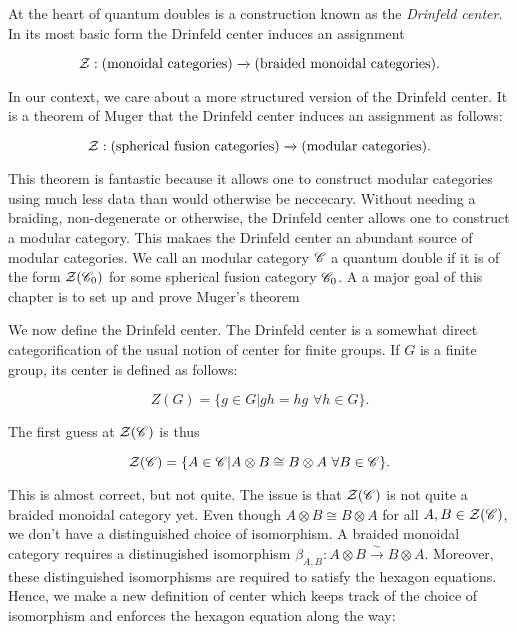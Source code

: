 At the heart of quantum doubles is a construction known as the \textit{Drinfeld center}. In its most basic form the Drinfeld center induces an assignment

$$\mathcal{Z}: (\text{monoidal categories})\xrightarrow{}(\text{braided monoidal categories}).$$

In our context, we care about a more structured version of the Drinfeld center. It is a theorem of Muger that the Drinfeld center induces an assignment as follows:

$$\mathcal{Z}: (\text{spherical fusion categories})\xrightarrow{}(\text{modular categories}).$$

This theorem is fantastic because it allows one to construct modular categories using much less data than would otherwise be neccecary. Without needing a braiding, non-degenerate or otherwise, the Drinfeld center allows one to construct a modular category. This makaes the Drinfeld center an abundant source of modular categories. We call an modular category $\mathscr{C}$ a quantum double if it is of the form $\mathcal{Z}(\mathscr{C}_0)$ for some spherical fusion category $\mathscr{C}_0$. A a major goal of this chapter is to set up and prove Muger's theorem

We now define the Drinfeld center. The Drinfeld center is a somewhat direct categorification of the usual notion of center for finite groups. If $G$ is a finite group, its center is defined as follows:

$$Z(G)=\{g\in G | gh=hg \,\, \forall h\in G\}.$$

The first guess at $\mathcal{Z}(\mathscr{C})$ is thus

$$\mathcal{Z}(\mathscr{C})=\{A\in \mathscr{C} | A\otimes B \cong B\otimes A \,\, \forall B\in \mathscr{C}\}.$$

This is almost correct, but not quite. The issue is that $\mathcal{Z}(\mathscr{C})$ is not quite a braided monoidal category yet. Even though $A\otimes B\cong B\otimes A$ for all $A,B\in \mathcal{Z}(\mathscr{C})$, we don't have a distinguished choice of isomorphism. A braided monoidal category requires a distinugished isomorphism $\beta_{A,B}:A\otimes B\xrightarrow{\sim} B\otimes A$. Moreover, these distinguished isomorphisms are required to satisfy the hexagon equations. Hence, we make a new definition of center which keeps track of the choice of isomorphism and enforces the hexagon equation along the way:


